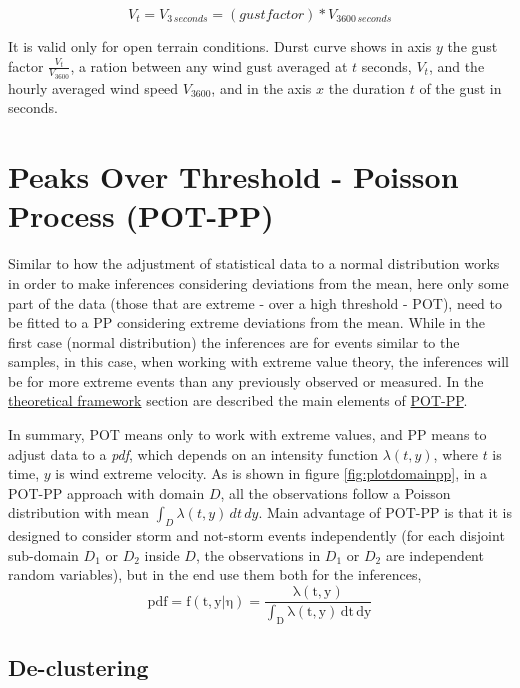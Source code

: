 \documentclass[12pt,oneside]{reedthesis}
\begin{document}
\[
V_t = V_{3\,seconds} = (gust factor) * V_{3600\,seconds}
\]

It is valid only for open terrain conditions. Durst curve shows in axis \(y\) the gust factor \(\frac{V_t}{V_{3600}}\), a ration between any wind gust averaged at \(t\) seconds, \(V_t\), and the hourly averaged wind speed \(V_{3600}\), and in the axis \(x\) the duration \(t\) of the gust in seconds.

\hypertarget{peaks-over-threshold---poisson-process-pot-pp}{%
\section{Peaks Over Threshold - Poisson Process (POT-PP)}\label{peaks-over-threshold---poisson-process-pot-pp}}

Similar to how the adjustment of statistical data to a normal distribution works in order to make inferences considering deviations from the mean, here only some part of the data (those that are extreme - over a high threshold - POT), need to be fitted to a PP considering extreme deviations from the mean. While in the first case (normal distribution) the inferences are for events similar to the samples, in this case, when working with extreme value theory, the inferences will be for more extreme events than any previously observed or measured. In the \protect\hyperlink{rmd-thefra}{theoretical framework} section are described the main elements of \protect\hyperlink{pot-pp}{POT-PP}.

In summary, POT means only to work with extreme values, and PP means to adjust data to a \emph{pdf}, which depends on an intensity function \(\lambda(t,y)\), where \(t\) is time, \(y\) is wind extreme velocity. As is shown in figure \ref{fig:plotdomainpp}, in a POT-PP approach with domain \(D\), all the observations follow a Poisson distribution with mean \(\int_D\lambda(t,y)\,dt\,dy\). Main advantage of POT-PP is that it is designed to consider storm and not-storm events independently (for each disjoint sub-domain \(D_1\) or \(D_2\) inside \(D\), the observations in \(D_1\) or \(D_2\) are independent random variables), but in the end use them both for the inferences,
\begin{equation}
  \mathrm{
          pdf = f(t,y|\eta) = \frac{\lambda(t,y)}{\int_D\lambda(t,y)\,dt\,dy}
        }
  \label{eq:pppdf}
\end{equation}
\hypertarget{de-clustering}{%
\subsection{De-clustering}\label{de-clustering}}
\end{document}
